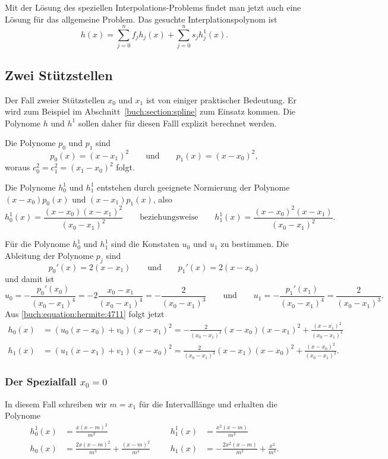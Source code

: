 Mit der Lösung des speziellen Interpolations-Problems findet man jetzt
auch eine Lösung für das allgemeine Problem.
Das gesuchte Interplationspolynom ist
\[
h(x) 
=
\sum_{j=0}^n f_j h_j(x)
+
\sum_{j=0}^n s_j h^1_j(x).
\]

\subsection{Zwei Stützstellen
\label{buch:subsection:hermite:zweistuetzstellen}}
Der Fall zweier Stützstellen $x_0$ und $x_1$ ist von einiger praktischer
Bedeutung.
Er wird zum Beispiel im Abschnitt~\ref{buch:section:spline}
zum Einsatz kommen.
Die Polynome $h$ und $h^1$ sollen daher für diesen Falll explizit
berechnet werden.

Die Polynome $p_0$ und $p_1$ sind
\[
p_0(x) = (x-x_1)^2
\qquad\text{und}\qquad
p_1(x) = (x-x_0)^2,
\]
woraus $c_0^2 = c_1^2 = (x_1-x_0)^2$ folgt.

Die Polynome $h_0^1$ und $h_1^1$ entstehen durch geeignete Normierung
der Polynome $(x-x_0)p_0(x)$ und $(x-x_1)p_1(x)$, also
\[
h_0^1(x)
=
\frac{(x-x_0)(x-x_1)^2}{(x_0-x_1)^2}
\qquad\text{beziehungsweise}\qquad
h_1^1(x)
=
\frac{(x-x_0)^2(x-x_1)}{(x_0-x_1)^2}.
\]

Für die Polynome $h^1_0$ und $h^1_1$ sind die Konstaten $u_0$ und $u_1$
zu bestimmen.
Die Ableitung der Polynome $p_j$ sind
\[
p_0'(x) = 2(x-x_1)
\qquad\text{und}\qquad
p_1'(x) = 2(x-x_0)
\]
und damit ist
\[
u_0
=
-\frac{p_0'(x_0) }{(x_0-x_1)^4}
=
-2\frac{x_0-x_1}{(x_0-x_1)^4}
=
-\frac{2}{(x_0-x_1)^3}
\qquad\text{und}\qquad
u_1
=
-\frac{p_1'(x_1) }{(x_0-x_1)^4}
=
\frac{2}{(x_0-x_1)^3}.
\]
Aus \eqref{buch:equation:hermite:4711} folgt jetzt
\begin{align*}
h_0(x)
&=
(u_0(x-x_0)+v_0)(x-x_1)^2
=
-\frac{2}{(x_0-x_1)^3}(x-x_0)(x-x_1)^2 + \frac{(x-x_1)^2}{(x_0-x_1)^4}
\\
h_1(x)
&=
(u_1(x-x_1)+v_1)(x-x_0)^2
=
\frac{2}{(x_0-x_1)^3}(x-x_1)(x-x_0)^2 +\frac{(x-x_0)^2}{(x_0-x_1)^2}.
\end{align*}

\subsubsection{Der Spezialfall $x_0=0$}
In diesem Fall schreiben wir $m=x_1$ für die Intervalllänge und erhalten
die Polynome
\begin{equation}
\begin{aligned}
h_0^1(x) &= \frac{x(x-m)^2}{m^2}
&&&
h_1^1(x) &= \frac{x^2(x-m)}{m^2}
\\
h_0(x)   &= \frac{2x(x-m)^2}{m^3} +\frac{(x-m)^2}{m^4}
&&&
h_1(x)   &= -\frac{2x^2(x-m)}{m^3} +\frac{x^2}{m^4}.
\end{aligned}
\end{equation}
%
%
%
%

